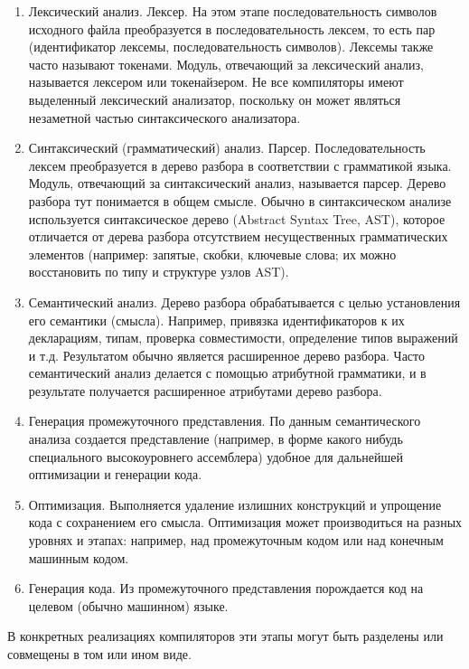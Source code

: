\documentclass[a4paper,12pt,titlepage]{extarticle}
\begin{document}
\begin{enumerate}
  \item Лексический анализ. Лексер. На этом этапе последовательность символов
  исходного файла преобразуется в последовательность лексем, то есть пар (идентификатор
  лексемы, последовательность символов). Лексемы также часто называют токенами.
  Модуль, отвечающий за лексический анализ, называется лексером или
  токенайзером. Не все компиляторы имеют выделенный лексический анализатор,
  поскольку он может являться незаметной частью синтаксического анализатора.
  \item Синтаксический (грамматический) анализ. Парсер. Последовательность
  лексем преобразуется в дерево разбора в соответствии с грамматикой языка.
  Модуль, отвечающий за синтаксический анализ, называется парсер. Дерево
  разбора тут понимается в общем смысле. Обычно в синтаксическом анализе
  используется синтаксическое дерево (Abstract Syntax Tree, AST), которое
  отличается от дерева разбора отсутствием несущественных грамматических элементов
  (например: запятые, скобки, ключевые слова; их можно восстановить по
  типу и структуре узлов AST).
  \item Семантический анализ. Дерево разбора обрабатывается с целью
  установления его семантики (смысла). Например, привязка идентификаторов к
  их декларациям, типам, проверка совместимости, определение типов выражений и
  т.д. Результатом обычно является расширенное дерево разбора. Часто
  семантический анализ делается с помощью атрибутной грамматики, и в результате
  получается расширенное атрибутами дерево разбора.
  \item Генерация промежуточного представления. По данным семантического
  анализа создается представление (например, в форме какого нибудь специального
  высокоуровнего ассемблера) удобное для дальнейшей оптимизации и генерации
  кода.
  \item Оптимизация. Выполняется удаление излишних конструкций и упрощение кода
  с сохранением его смысла. Оптимизация может производиться на разных уровнях и
  этапах: например, над промежуточным кодом или над конечным машинным кодом.
  \item Генерация кода. Из промежуточного представления порождается код на
  целевом (обычно машинном) языке.
\end{enumerate}
В конкретных реализациях компиляторов эти этапы могут быть разделены или
совмещены в том или ином виде.
\end{document}
